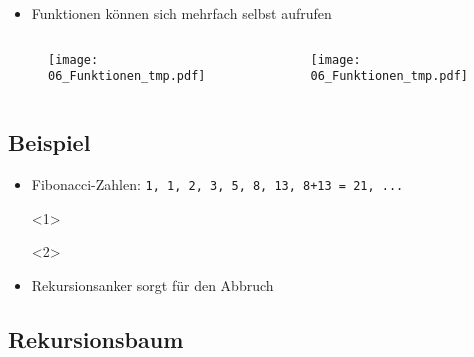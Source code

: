 \begin{frame}[t]
    \slidehead

    \begin{itemize}
        \item Funktionen können sich mehrfach selbst aufrufen
    \end{itemize}

    \begin{columns}
        \begin{column}{5cm}
            \begin{figure}
                    \texttt{[image: 06\_Funktionen\_tmp.pdf]}
            \end{figure}
        \end{column}

        \begin{column}{5cm}
            \begin{figure}
                    \texttt{[image: 06\_Funktionen\_tmp.pdf]}
            \end{figure}
        \end{column}
    \end{columns}
\end{frame}

\subsection*{Beispiel}
\begin{frame}
    \slidehead

    \begin{itemize}
        \item Fibonacci-Zahlen: \texttt{1, 1, 2, 3, 5, 8, 13, 8+13 = 21, ...}
            \begin{onlyenv}<1>
            \end{onlyenv}

            \begin{onlyenv}<2>
            \end{onlyenv}

        \item<2> Rekursionsanker sorgt für den Abbruch
    \end{itemize}

\end{frame}

\subsection{Rekursionsbaum}

